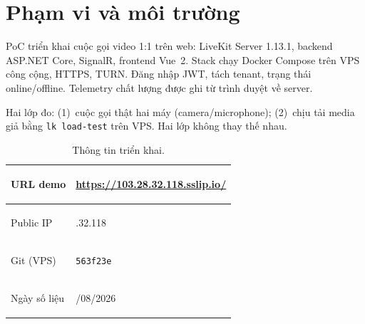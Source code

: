 \section{Phạm vi và môi trường}

PoC triển khai cuộc gọi video 1:1 trên web: LiveKit Server 1.13.1, backend ASP.NET Core,
SignalR, frontend Vue~2. Stack chạy Docker Compose trên VPS công cộng, HTTPS, TURN.
Đăng nhập JWT, tách tenant, trạng thái online/offline. Telemetry chất lượng được ghi từ
trình duyệt về server.

Hai lớp đo: (1)~cuộc gọi thật hai máy (camera/microphone); (2)~chịu tải media giả bằng
\texttt{lk load-test} trên VPS. Hai lớp không thay thế nhau.

\begin{table}[htbp]
\centering
\small
\begin{tabularx}{\textwidth}{|>{\bfseries\raggedright\arraybackslash}p{}|>{\raggedright\arraybackslash}X|}
\hline
URL demo & \url{https://103.28.32.118.sslip.io/} \\
\hline
Public IP & 103.28.32.118 \\
\hline
Git (VPS) & \texttt{563f23e} \\
\hline
Ngày số liệu & 06/08/2026 \\
\hline
\end{tabularx}
\caption{Thông tin triển khai.}
\label{tab:deploy-meta}
\end{table}
